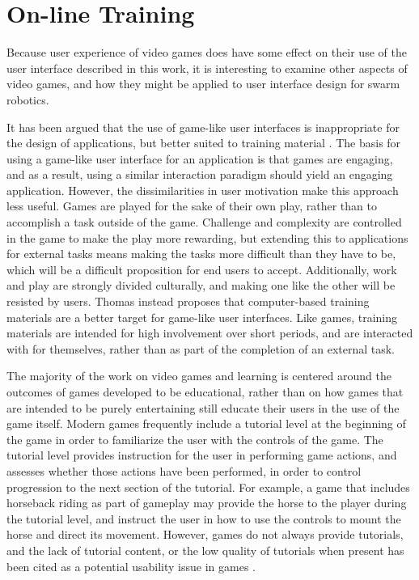 \section{On-line Training}

Because user experience of video games does have some effect on their use of the user interface described in this work, it is interesting to examine other aspects of video games, and how they might be applied to user interface design for swarm robotics. 

It has been argued that the use of game-like user interfaces is inappropriate for the design of applications, but better suited to training material \citep{thomas1994games}. The basis for using a game-like user interface for an application is that games are engaging, and as a result, using a similar interaction paradigm should yield an engaging application. 
However, the dissimilarities in user motivation make this approach less useful. 
Games are played for the sake of their own play, rather than to accomplish a task outside of the game. 
Challenge and complexity are controlled in the game to make the play more rewarding, but extending this to applications for external tasks means making the tasks more difficult than they have to be, which will be a difficult proposition for end users to accept. 
Additionally, work and play are strongly divided culturally, and making one like the other will be resisted by users. 
Thomas instead proposes that computer-based training materials are a better target for game-like user interfaces. 
Like games, training materials are intended for high involvement over short periods, and are interacted with for themselves, rather than as part of the completion of an external task. 

The majority of the work on video games and learning is centered around the outcomes of games developed to be educational, rather than on how games that are intended to be purely entertaining still educate their users in the use of the game itself.
Modern games frequently include a tutorial level at the beginning of the game in order to familiarize the user with the controls of the game. 
The tutorial level provides instruction for the user in performing game actions, and assesses whether those actions have been performed, in order to control progression to the next section of the tutorial. 
For example, a game that includes horseback riding as part of gameplay may provide the horse to the player during the tutorial level, and instruct the user in how to use the controls to mount the horse and direct its movement. 
However, games do not always provide tutorials, and the lack of tutorial content, or the low quality of tutorials when present has been cited as a potential usability issue in games \citep{pinelle2008heuristic}.

